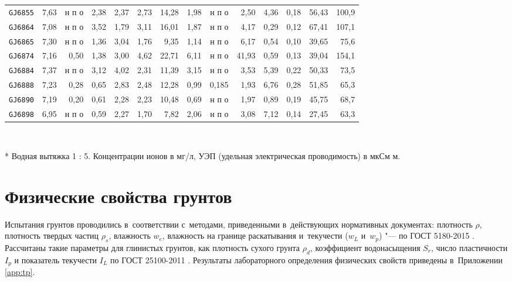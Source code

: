 \begin{sidewaystable}[p]
\begin{tabular}{@{}lrrrrrrrrrrrrr@{}}
    \texttt{GJ6855} & 7,63 & н п о & 2,38 & 2,37 & 2,73 & 14,28 & 1,98 & н п о &  2,50 & 4,36 & 0,18 & 56,43 & 100,9 \\
    \texttt{GJ6864} & 7,08 & н п о & 3,52 & 1,79 & 3,11 & 16,01 & 1,87 & н п о &  4,17 & 0,29 & 0,12 & 67,41 & 107,1 \\
    \texttt{GJ6865} & 7,30 & н п о & 1,36 & 3,04 & 1,76 &  9,35 & 1,14 & н п о &  6,17 & 0,54 & 0,10 & 39,65 &  75,6 \\
    \texttt{GJ6874} & 7,16 & 0,50  & 1,38 & 3,00 & 4,62 & 22,71 & 6,11 & н п о & 41,93 & 0,59 & 0,13 & 39,04 & 154,1 \\
    \texttt{GJ6884} & 7,37 & н п о & 3,12 & 4,02 & 2,31 & 11,39 & 3,15 & н п о &  3,53 & 5,39 & 0,22 & 50,33 &  73,5 \\
    \texttt{GJ6888} & 7,23 & 0,28  & 0,65 & 2,83 & 2,48 & 12,28 & 0,99 & 0,185 &  1,93 & 6,76 & 0,28 & 51,85 &  65,3 \\
    \texttt{GJ6890} & 7,19 & 0,20  & 0,61 & 2,28 & 2,23 & 10,48 & 0,69 & н п о &  1,97 & 0,89 & 0,19 & 45,75 &  68,7 \\
    \texttt{GJ6898} & 6,95 & н п о & 0,59 & 2,27 & 1,70 &  7,82 & 2,06 & н п о &  3,08 & 7,12 & 0,14 & 27,45 &  63,3 \\
    \bottomrule 
    \end{tabular}
    \\ 
    \raggedright 
    {* Водная вытяжка 1 : 5. Концентрации ионов в мг/л, УЭП (удельная электрическая проводимость) в мкСм м.}
\end{sidewaystable}



\section{Физические свойства грунтов}

Испытания грунтов проводились в~соответствии с~методами, приведенными в~действующих нормативных документах:
плотность $\rho$, 
плотность твердых частиц $\rho_s$, 
влажность $w_e$, 
влажность на границе раскатывания и~текучести ($w_L$ и~$w_p$) "--- по ГОСТ 5180-2015 \cite{gost5180}. 
Рассчитаны такие параметры для глинистых грунтов, как
плотность сухого грунта $\rho_d$,  
коэффициент водонасыщения $S_r$, 
число пластичности $I_p$ 
и показатель текучести $I_L$ по ГОСТ 25100-2011 \cite{gost25100}.
Результаты лабораторного определения физических свойств приведены в~Приложении \ref{app:tp}.



